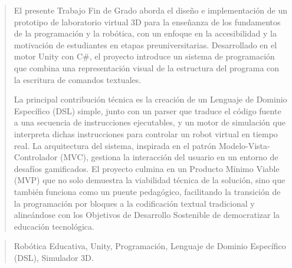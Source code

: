 \documentclass[a4paper,12pt,twoside]{memoir}
\begin{document}
	
		\frontmatter
		
		\renewcommand*\abstractname{Resumen}
		\begin{abstract}
			 El presente Trabajo Fin de Grado aborda el diseño e implementación de un prototipo de laboratorio virtual 3D para la enseñanza de los fundamentos de la programación y la robótica, con un enfoque en la accesibilidad y la motivación de estudiantes en etapas preuniversitarias. Desarrollado en el motor Unity con C\#, el proyecto introduce un sistema de programación que combina una representación visual de la estructura del programa con la escritura de comandos textuales.
			
			La principal contribución técnica es la creación de un Lenguaje de Dominio Específico (DSL) simple, junto con un parser que traduce el código fuente a una secuencia de instrucciones ejecutables, y un motor de simulación que interpreta dichas instrucciones para controlar un robot virtual en tiempo real. La arquitectura del sistema, inspirada en el patrón Modelo-Vista-Controlador (MVC), gestiona la interacción del usuario en un entorno de desafíos gamificados. El proyecto culmina en un Producto Mínimo Viable (MVP) que no solo demuestra la viabilidad técnica de la solución, sino que también funciona como un puente pedagógico, facilitando la transición de la programación por bloques a la codificación textual tradicional y alineándose con los Objetivos de Desarrollo Sostenible de democratizar la educación tecnológica.
		\end{abstract}
		
		\renewcommand*\abstractname{Descriptores}
		\begin{abstract}
		    Robótica Educativa, Unity, Programación, Lenguaje de Dominio Específico (DSL), Simulador 3D.
		
		\end{abstract}
		
		\clearpage
		
\end{document}

